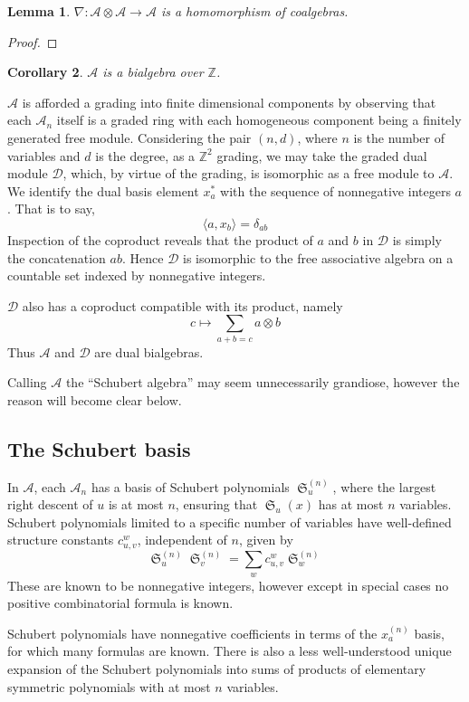 \documentclass{amsart}
\newtheorem{lemma}{Lemma}[subsection]
\newtheorem{corollary}[lemma]{Corollary}
\theoremstyle{definition}
\theoremstyle{remark}
\numberwithin{equation}{subsection}
\DeclareMathOperator{\sch}{\mathfrak{S}}
\newcommand{\coma}{\mathcal{A}}
\newcommand{\dcoma}{\mathcal{D}}
\begin{document}
\begin{lemma}
	$\nabla:\coma\otimes \coma\to \coma$ is a homomorphism of coalgebras.
\end{lemma}
\begin{proof}
	
\end{proof}

\begin{corollary}
	$\coma$ is a bialgebra over $\mathbb{Z}$.
\end{corollary}

$\coma$ is afforded a grading into finite dimensional components by observing that each $\coma_n$ itself is a graded ring with each homogeneous component being a finitely generated free module. Considering the pair $(n, d)$, where $n$ is the number of variables and $d$ is the degree, as a $\mathbb{Z}^2$ grading, we may take the graded dual module $\dcoma$, which, by virtue of the grading, is isomorphic as a free module to $\coma$. We identify the dual basis element $x_a^*$ with the sequence of nonnegative integers $a$. That is to say,
$$\langle a, x_b\rangle = \delta_{ab}$$
Inspection of the coproduct reveals that the product of $a$ and $b$ in $\dcoma$ is simply the concatenation $ab$. Hence $\dcoma$ is isomorphic to the free associative algebra on a countable set indexed by nonnegative integers.

$\dcoma$ also has a coproduct compatible with its product, namely
$$c\mapsto \sum_{a+b=c} a\otimes b$$
Thus $\coma$ and $\dcoma$ are dual bialgebras.

Calling $\coma$ the ``Schubert algebra'' may seem unnecessarily grandiose, however the reason will become clear below.

\subsection{The Schubert basis}

In $\coma$, each $\coma_n$ has a basis of Schubert polynomials $\sch_u^{(n)}$, where the largest right descent of $u$ is at most $n$, ensuring that $\sch_u(x)$ has at most $n$ variables. Schubert polynomials limited to a specific number of variables have well-defined structure constants $c_{u,v}^w$, independent of $n$, given by
$$\sch_u^{(n)}\sch_v^{(n)} = \sum_{w}c_{u,v}^w\sch_w^{(n)}$$
These are known to be nonnegative integers, however except in special cases no positive combinatorial formula is known.

Schubert polynomials have nonnegative coefficients in terms of the $x_a^{(n)}$ basis, for which many formulas are known. There is also a less well-understood unique expansion of the Schubert polynomials into sums of products of elementary symmetric polynomials with at most $n$ variables. 
\end{document}
